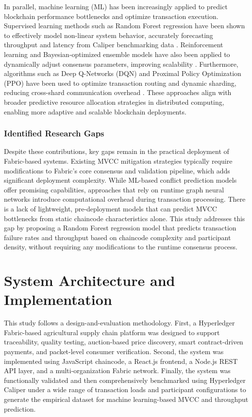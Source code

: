 \documentclass[12pt]{article}
\begin{document}
In parallel, machine learning (ML) has been increasingly applied to predict blockchain performance bottlenecks and optimize transaction execution. Supervised learning methods such as Random Forest regression have been shown to effectively model non-linear system behavior, accurately forecasting throughput and latency from Caliper benchmarking data \cite{Deshinta_Predicting_2025}. Reinforcement learning and Bayesian-optimized ensemble models have also been applied to dynamically adjust consensus parameters, improving scalability \cite{Manjula_Scalability_2025}. Furthermore, algorithms such as Deep Q-Networks (DQN) and Proximal Policy Optimization (PPO) have been used to optimize transaction routing and dynamic sharding, reducing cross-shard communication overhead \cite{Mutum_Dynamic_2025}. These approaches align with broader predictive resource allocation strategies in distributed computing, enabling more adaptive and scalable blockchain deployments.

\subsubsection{Identified Research Gaps}

Despite these contributions, key gaps remain in the practical deployment of Fabric-based systems. Existing MVCC mitigation strategies typically require modifications to Fabric's core consensus and validation pipeline, which adds significant deployment complexity. While ML-based conflict prediction models offer promising capabilities, approaches that rely on runtime graph neural networks introduce computational overhead during transaction processing. There is a lack of lightweight, pre-deployment models that can predict MVCC bottlenecks from static chaincode characteristics alone. This study addresses this gap by proposing a Random Forest regression model that predicts transaction failure rates and throughput based on chaincode complexity and participant density, without requiring any modifications to the runtime consensus process.

\section{System Architecture and Implementation}
	
	This study follows a design-and-evaluation methodology. First, a Hyperledger Fabric-based agricultural supply chain platform was designed to support traceability, quality testing, auction-based price discovery, smart contract-driven payments, and packet-level consumer verification. Second, the system was implemented using JavaScript chaincode, a React.js frontend, a Node.js REST API layer, and a multi-organization Fabric network. Finally, the system was functionally validated and then comprehensively benchmarked using Hyperledger Caliper under a wide range of transaction loads and participant configurations to generate the empirical dataset for machine learning-based MVCC and throughput prediction.
	
\end{document}
